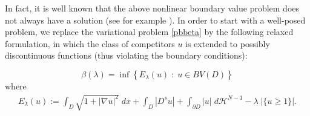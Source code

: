 \documentclass[reqno,11pt]{amsart}
\theoremstyle{definition}
\numberwithin{equation}{section}
\newcommand{\HH}{\mathcal{H}}
\newcommand{\1}{{{\bf 1}\kern-0,28em\rm l}}
\def\sepa{\; : \;}
\begin{document}
In fact, it is well known that the above nonlinear boundary value problem does not always have a solution (see for example \cite{ekeland1974analyse}). In order to start with a well-posed problem, we replace the variational problem \eqref{pbbeta} by the following relaxed formulation, in which the class of competitors $u$ is extended to possibly discontinuous functions (thus violating the boundary conditions):

\medskip
\begin{equation}
\label{betarelax}
\beta(\lambda) = \inf \left\{ E_\lambda(u) \sepa u\in BV(D) \right\}
\end{equation}
where
\begin{align}\label{El}
E_\lambda(u) := \int_D \sqrt{1+|\nabla u|^2}\; dx + \int_D |D^s u| + \int_{\partial D} |u|\; d\HH^{N-1} - \lambda\; |\{ u\ge 1\}|.
\end{align}
\end{document}
